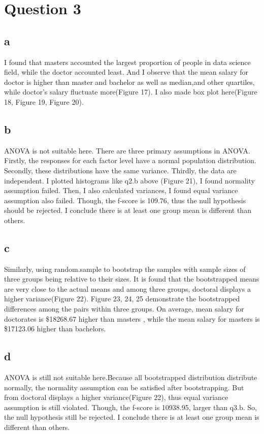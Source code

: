 \documentclass[10pt,onecolumn,letterpaper]{article}
\begin{document}
\section*{Question 3}
\subsection*{a}
I found that masters accounted the largest proportion of people in data science field, while the doctor accounted least. And I observe that the mean salary for doctor is higher than master and bachelor as well as median,and other quartiles, while doctor's salary fluctuate more(Figure 17). I also made box plot here(Figure 18, Figure 19, Figure 20). 


\subsection*{b}
ANOVA is not suitable here. There are three primary assumptions in ANOVA. Firstly, the responses for each factor level have a normal population distribution. Secondly, these distributions have the same variance. Thirdly, the data are independent. I plotted histograms like q2.b above (Figure 21), I found normality assumption failed. Then, I also calculated variances, I found equal variance assumption also failed. Though, the f-score is 109.76, thus the null hypothesis should be rejected. I conclude there is at least one group mean is different than others.

\subsection*{c}
Similarly, using random.sample to bootstrap the samples with sample sizes of three groups being relative to their sizes. It is found that the bootstrapped means are very close to the actual means and among three groups, doctoral displays a higher variance(Figure 22).  Figure 23, 24, 25 demonstrate the bootstrapped differences among the pairs within three groups. On average, mean salary for doctorates is \$18268.67 higher than masters , while the mean salary for masters is \$17123.06 higher than bachelors. 

\subsection*{d}
ANOVA is still not suitable here.Because all bootstrapped distribution distribute normally, the normality assumption can be satisfied after bootstrapping. But from doctoral displays a higher variance(Figure 22), thus equal variance assumption is still violated. Though, the f-score is 10938.95, larger than q3.b. So, the null hypothesis still be rejected. I conclude there is at least one group mean is different than others.
\end{document}

